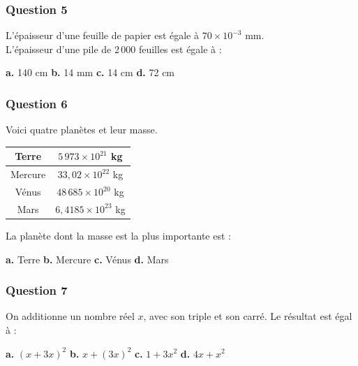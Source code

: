 \documentclass[10pt]{article}
\begin{document}
\subsubsection*{Question 5}
L'épaisseur d'une feuille de papier est égale à $70 \times 10^{-3}$ mm. \\
L'épaisseur d'une pile de 2\,000 feuilles est égale à :

\textbf{a.} 140 cm \hfill \textbf{b.} 14 mm \hfill \textbf{c.} 14 cm \hfill \textbf{d.} 72 cm

\subsubsection*{Question 6}
Voici quatre planètes et leur masse.

\begin{center}
\begin{tabular}{|c|c|}
\hline
Terre & $5\,973 \times 10^{21}$ kg \\
\hline
Mercure & $33,02 \times 10^{22}$ kg \\
\hline
Vénus & $48\,685 \times 10^{20}$ kg \\
\hline
Mars & $6,4185 \times 10^{23}$ kg \\
\hline
\end{tabular}
\end{center}

La planète dont la masse est la plus importante est :

\textbf{a.} Terre \hfill \textbf{b.} Mercure \hfill \textbf{c.} Vénus \hfill \textbf{d.} Mars

\subsubsection*{Question 7}
On additionne un nombre réel $x$, avec son triple et son carré. Le résultat est égal à :

\textbf{a.} $(x + 3x)^2$ \hfill \textbf{b.} $x + (3x)^2$ \hfill \textbf{c.} $1 + 3x^2$ \hfill \textbf{d.} $4x + x^2$

\bigskip
\end{document}
